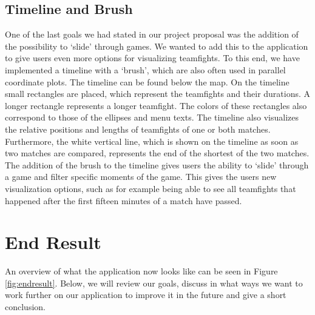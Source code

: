 \documentclass[11pt,twoside,a4paper]{article}
\begin{document}
\subsection{Timeline and Brush}
\label{subsec:timeline}
One of the last goals we had stated in our project proposal was the addition of the possibility to `slide' through games. We wanted to add this to the application to give users even more options for visualizing teamfights. To this end, we have implemented a timeline with a `brush', which are also often used in parallel coordinate plots.\newline
The timeline can be found below the map. On the timeline small rectangles are placed, which represent the teamfights and their durations. A longer rectangle represents a longer teamfight. The colors of these rectangles also correspond to those of the ellipses and menu texts. The timeline also visualizes the relative positions and lengths of teamfights of one or both matches. Furthermore, the white vertical line, which is shown on the timeline as soon as two matches are compared, represents the end of the shortest of the two matches.\newline\newline
The addition of the brush to the timeline gives users the ability to `slide' through a game and filter specific moments of the game. This gives the users new visualization options, such as for example being able to see all teamfights that happened after the first fifteen minutes of a match have passed. 

\section{End Result}
\label{subsec:endresult}
An overview of what the application now looks like can be seen in Figure \ref{fig:endresult}. Below, we will review our goals, discuss in what ways we want to work further on our application to improve it in the future and give a short conclusion.
\end{document}
